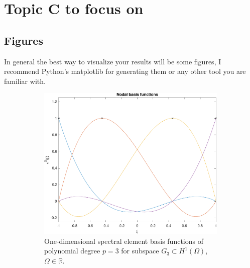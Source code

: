 \documentclass{project-logbook}
\begin{document}
\section{Topic C to focus on} \label{sec:topic_c}
	\subsection{Figures} \label{sub:figures}

		\begin{HighlightedNote}{}
			In general the best way to visualize your results will be some figures, I recommend Python's matplotlib for generating them or any other tool you are familiar with.
		\end{HighlightedNote}

		\begin{figure}[htp]
    			\centering
				\begin{subfigure}{0.48\textwidth}
        					\centering
        						\includegraphics[width=\textwidth]{figures/sfem_1D_p3.pdf}
        						\caption{One-dimensional spectral element basis functions of polynomial degree $p = 3$ for subspace $G_{3} \subset H^{1}(\Omega)$, $\Omega\in\mathbb{R}$.}
    				\end{subfigure}
    				\hspace{.35cm}
    				\begin{subfigure}{0.48\textwidth}
        					\centering

\end{subfigure}
\end{figure}
\end{document}
